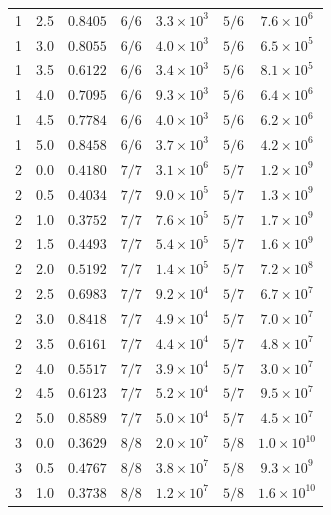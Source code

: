 \begin{table}[ht]
\begin{tabular}{cc c cc cc}
        1 & 2.5 & $0.8405$ & $6/6$ & $3.3 \times 10^{3}$ & $5/6$ & $7.6 \times 10^{6}$ \\
        1 & 3.0 & $0.8055$ & $6/6$ & $4.0 \times 10^{3}$ & $5/6$ & $6.5 \times 10^{5}$ \\
        1 & 3.5 & $0.6122$ & $6/6$ & $3.4 \times 10^{3}$ & $5/6$ & $8.1 \times 10^{5}$ \\
        1 & 4.0 & $0.7095$ & $6/6$ & $9.3 \times 10^{3}$ & $5/6$ & $6.4 \times 10^{6}$ \\
        1 & 4.5 & $0.7784$ & $6/6$ & $4.0 \times 10^{3}$ & $5/6$ & $6.2 \times 10^{6}$ \\
        1 & 5.0 & $0.8458$ & $6/6$ & $3.7 \times 10^{3}$ & $5/6$ & $4.2 \times 10^{6}$ \\
        2 & 0.0 & $0.4180$ & $7/7$ & $3.1 \times 10^{6}$ & $5/7$ & $1.2 \times 10^{9}$ \\
        2 & 0.5 & $0.4034$ & $7/7$ & $9.0 \times 10^{5}$ & $5/7$ & $1.3 \times 10^{9}$ \\
        2 & 1.0 & $0.3752$ & $7/7$ & $7.6 \times 10^{5}$ & $5/7$ & $1.7 \times 10^{9}$ \\
        2 & 1.5 & $0.4493$ & $7/7$ & $5.4 \times 10^{5}$ & $5/7$ & $1.6 \times 10^{9}$ \\
        2 & 2.0 & $0.5192$ & $7/7$ & $1.4 \times 10^{5}$ & $5/7$ & $7.2 \times 10^{8}$ \\
        2 & 2.5 & $0.6983$ & $7/7$ & $9.2 \times 10^{4}$ & $5/7$ & $6.7 \times 10^{7}$ \\
        2 & 3.0 & $0.8418$ & $7/7$ & $4.9 \times 10^{4}$ & $5/7$ & $7.0 \times 10^{7}$ \\
        2 & 3.5 & $0.6161$ & $7/7$ & $4.4 \times 10^{4}$ & $5/7$ & $4.8 \times 10^{7}$ \\
        2 & 4.0 & $0.5517$ & $7/7$ & $3.9 \times 10^{4}$ & $5/7$ & $3.0 \times 10^{7}$ \\
        2 & 4.5 & $0.6123$ & $7/7$ & $5.2 \times 10^{4}$ & $5/7$ & $9.5 \times 10^{7}$ \\
        2 & 5.0 & $0.8589$ & $7/7$ & $5.0 \times 10^{4}$ & $5/7$ & $4.5 \times 10^{7}$ \\
        3 & 0.0 & $0.3629$ & $8/8$ & $2.0 \times 10^{7}$ & $5/8$ & $1.0 \times 10^{10}$ \\
        3 & 0.5 & $0.4767$ & $8/8$ & $3.8 \times 10^{7}$ & $5/8$ & $9.3 \times 10^{9}$ \\
        3 & 1.0 & $0.3738$ & $8/8$ & $1.2 \times 10^{7}$ & $5/8$ & $1.6 \times 10^{10}$ \\

\end{tabular}
\end{table}
